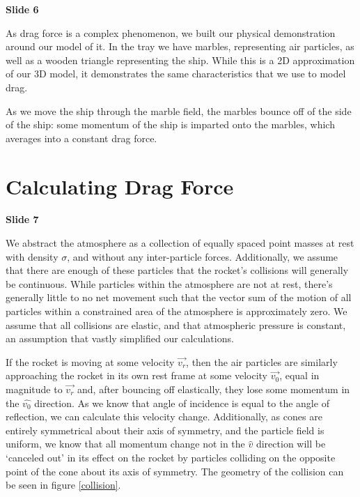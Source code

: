 \documentclass[]{article}
\begin{document}
\textbf{Slide 6}

As drag force is a complex phenomenon, we built our physical demonstration around our model of it. In the tray we have marbles, representing air particles, as well as a wooden triangle representing the ship. While this is a 2D approximation of our 3D model, it demonstrates the same characteristics that we use to model drag.

As we move the ship through the marble field, the marbles bounce off of the side of the ship: some momentum of the ship is imparted onto the marbles, which averages into a constant drag force.

\newpage
\section{Calculating Drag Force}

\textbf{Slide 7}

We abstract the atmosphere as a collection of equally spaced point masses at rest with density $\sigma$, and without any inter-particle forces. Additionally, we assume that there are enough of these particles that the rocket's collisions will generally be continuous. While particles within the atmosphere are not at rest, there's generally little to no net movement such that the vector sum of the motion of all particles within a constrained area of the atmosphere is approximately zero. We assume that all collisions are elastic, and that atmospheric pressure is constant, an assumption that vastly simplified our calculations.


If the rocket is moving at some velocity $\vec{v_{r}}$, then the air particles are similarly approaching the rocket in its own rest frame at some velocity $\vec{v_0}$, equal in magnitude to $\vec{v_{r}}$ and, after bouncing off elastically, they lose some momentum in the $\hat{v_0}$ direction. As we know that angle of incidence is equal to the angle of reflection, we can calculate this velocity change. Additionally, as cones are entirely symmetrical about their axis of symmetry, and the particle field is uniform, we know that all momentum change not in the $\hat{v}$ direction will be `canceled out' in its effect on the rocket by particles colliding on the opposite point of the cone about its axis of symmetry. The geometry of the collision can be seen in figure \ref{collision}.
\end{document}

